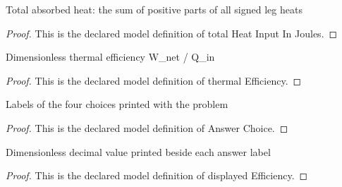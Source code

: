 \begin{definition}
  \label{def:physics:phyx-mini-0429:phyxminiproblems-problemphyxmini0429-totalheatinputinjoules}
  Total absorbed heat: the sum of positive parts of all signed leg heats
\end{definition}
\begin{proof}
  This is the declared model definition of total Heat Input In Joules.
\end{proof}
\begin{definition}
  \label{def:physics:phyx-mini-0429:phyxminiproblems-problemphyxmini0429-thermalefficiency}
  Dimensionless thermal efficiency W\_net / Q\_in
\end{definition}
\begin{proof}
  This is the declared model definition of thermal Efficiency.
\end{proof}
\begin{definition}
  \label{def:physics:phyx-mini-0429:phyxminiproblems-problemphyxmini0429-answerchoice}
  Labels of the four choices printed with the problem
\end{definition}
\begin{proof}
  This is the declared model definition of Answer Choice.
\end{proof}
\begin{definition}
  \label{def:physics:phyx-mini-0429:phyxminiproblems-problemphyxmini0429-displayedefficiency}
  Dimensionless decimal value printed beside each answer label
\end{definition}
\begin{proof}
  This is the declared model definition of displayed Efficiency.
\end{proof}
